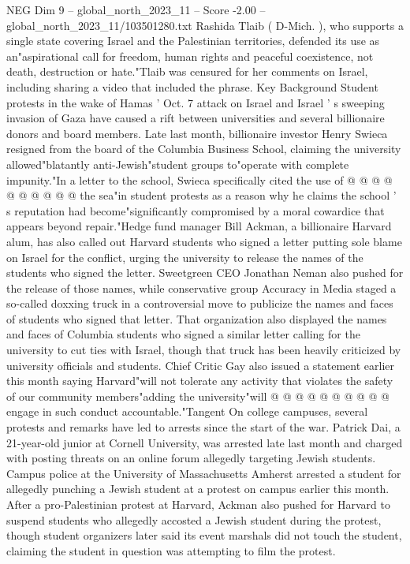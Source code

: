 \begin{textsample}{NEG Dim 9 – global\_north\_2023\_11 – Score -2.00 – global\_north\_2023\_11/103501280.txt}
Rashida Tlaib ( D-Mich. ), who supports a single state covering Israel and the Palestinian territories, defended its use as an"aspirational call for freedom, human rights and peaceful coexistence, not death, destruction or hate."Tlaib was censured for her comments on Israel, including sharing a video that included the phrase.
Key Background Student protests in the wake of Hamas ' Oct. 7 attack on Israel and Israel ' s sweeping invasion of Gaza have caused a rift between universities and several billionaire donors and board members.
Late last month, billionaire investor Henry Swieca resigned from the board of the Columbia Business School, claiming the university allowed"blatantly anti-Jewish"student groups to"operate with complete impunity."In a letter to the school, Swieca specifically cited the use of @ @ @ @ @ @ @ @ @ @ the sea"in student protests as a reason why he claims the school ' s reputation had become"significantly compromised by a moral cowardice that appears beyond repair."Hedge fund manager Bill Ackman, a billionaire Harvard alum, has also called out Harvard students who signed a letter putting sole blame on Israel for the conflict, urging the university to release the names of the students who signed the letter.
Sweetgreen CEO Jonathan Neman also pushed for the release of those names, while conservative group Accuracy in Media staged a so-called doxxing truck in a controversial move to publicize the names and faces of students who signed that letter.
That organization also displayed the names and faces of Columbia students who signed a similar letter calling for the university to cut ties with Israel, though that truck has been heavily criticized by university officials and students.
Chief Critic Gay also issued a statement earlier this month saying Harvard"will not tolerate any activity that violates the safety of our community members"adding the university"will @ @ @ @ @ @ @ @ @ @ engage in such conduct accountable."Tangent On college campuses, several protests and remarks have led to arrests since the start of the war.
Patrick Dai, a 21-year-old junior at Cornell University, was arrested late last month and charged with posting threats on an online forum allegedly targeting Jewish students.
Campus police at the University of Massachusetts Amherst arrested a student for allegedly punching a Jewish student at a protest on campus earlier this month.
After a pro-Palestinian protest at Harvard, Ackman also pushed for Harvard to suspend students who allegedly accosted a Jewish student during the protest, though student organizers later said its event marshals did not touch the student, claiming the student in question was attempting to film the protest.

\end{textsample}
